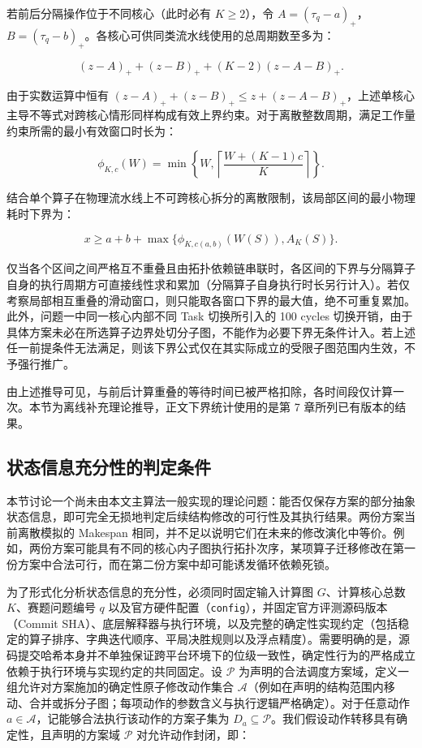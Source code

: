 \documentclass[anonymous,notoc]{gmcm2026}
\begin{document}
若前后分隔操作位于不同核心（此时必有 \(K \ge 2\)），令 \(A = (\tau_q - a)_+\)，\(B = (\tau_q - b)_+\)。各核心可供同类流水线使用的总周期数至多为：

\begin{equation}
(z - A)_+ + (z - B)_+ + (K - 2)(z - A - B)_+.
\end{equation}

由于实数运算中恒有 \((z - A)_+ + (z - B)_+ \le z + (z - A - B)_+\)，上述单核心主导不等式对跨核心情形同样构成有效上界约束。对于离散整数周期，满足工作量约束所需的最小有效窗口时长为：

\begin{equation}
\phi_{K,c}(W) = \min\left\{W, \left\lceil\frac{W + (K - 1)c}{K}\right\rceil\right\}.
\end{equation}

结合单个算子在物理流水线上不可跨核心拆分的离散限制，该局部区间的最小物理耗时下界为：

\begin{equation}
x \ge a + b + \max\{\phi_{K, c(a,b)}(W(S)), A_K(S)\}.
\end{equation}

仅当各个区间之间严格互不重叠且由拓扑依赖链串联时，各区间的下界与分隔算子自身的执行周期方可直接线性求和累加（分隔算子自身执行时长另行计入）。若仅考察局部相互重叠的滑动窗口，则只能取各窗口下界的最大值，绝不可重复累加。此外，问题一中同一核心内部不同 Task 切换所引入的 100 cycles 切换开销，由于具体方案未必在所选算子边界处切分子图，不能作为必要下界无条件计入。若上述任一前提条件无法满足，则该下界公式仅在其实际成立的受限子图范围内生效，不予强行推广。

由上述推导可见，与前后计算重叠的等待时间已被严格扣除，各时间段仅计算一次。本节为离线补充理论推导，正文下界统计使用的是第 7 章所列已有版本的结果。

\subsection{状态信息充分性的判定条件}

本节讨论一个尚未由本文主算法一般实现的理论问题：能否仅保存方案的部分抽象状态信息，即可完全无损地判定后续结构修改的可行性及其执行结果。两份方案当前离散模拟的 Makespan 相同，并不足以说明它们在未来的修改演化中等价。例如，两份方案可能具有不同的核心内子图执行拓扑次序，某项算子迁移修改在第一份方案中合法可行，而在第二份方案中却可能诱发循环依赖死锁。

为了形式化分析状态信息的充分性，必须同时固定输入计算图 \(G\)、计算核心总数 \(K\)、赛题问题编号 \(q\) 以及官方硬件配置（\texttt{config}），并固定官方评测源码版本（Commit SHA）、底层解释器与执行环境，以及完整的确定性实现约定（包括稳定的算子排序、字典迭代顺序、平局决胜规则以及浮点精度）。需要明确的是，源码提交哈希本身并不单独保证跨平台环境下的位级一致性，确定性行为的严格成立依赖于执行环境与实现约定的共同固定。设 \(\mathcal{P}\) 为声明的合法调度方案域，定义一组允许对方案施加的确定性原子修改动作集合 \(\mathcal{A}\)（例如在声明的结构范围内移动、合并或拆分子图；每项动作的参数含义与执行逻辑严格确定）。对于任意动作 \(a \in \mathcal{A}\)，记能够合法执行该动作的方案子集为 \(D_a \subseteq \mathcal{P}\)。我们假设动作转移具有确定性，且声明的方案域 \(\mathcal{P}\) 对允许动作封闭，即：
\end{document}
